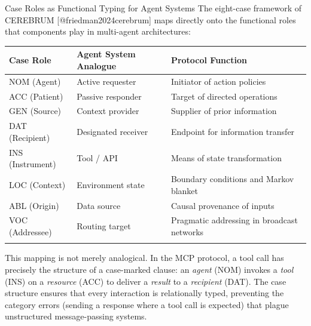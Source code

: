 \documentclass[
  ignorenonframetext,
]{beamer}
\newcounter{none} %
\begin{document}
\begin{frame}{Case Roles as Functional Typing for Agent Systems}
\protect{}\label{case-roles-as-functional-typing-for-agent-systems}
The eight-case framework of CEREBRUM {[}@friedman2024cerebrum{]} maps
directly onto the functional roles that components play in multi-agent
architectures:

{\def\LTcaptype{none} %
\begin{longtable}[]{@{}
  >{\raggedright\arraybackslash}p{}
  >{\raggedright\arraybackslash}p{}
  >{\raggedright\arraybackslash}p{}@{}}
\toprule\noalign{}
\begin{minipage}[b]{\linewidth}\raggedright
Case Role
\end{minipage} & \begin{minipage}[b]{\linewidth}\raggedright
Agent System Analogue
\end{minipage} & \begin{minipage}[b]{\linewidth}\raggedright
Protocol Function
\end{minipage} \\
\midrule\noalign{}
\endhead
NOM (Agent) & Active requester & Initiator of action policies \\
ACC (Patient) & Passive responder & Target of directed operations \\
GEN (Source) & Context provider & Supplier of prior information \\
DAT (Recipient) & Designated receiver & Endpoint for information
transfer \\
INS (Instrument) & Tool / API & Means of state transformation \\
LOC (Context) & Environment state & Boundary conditions and Markov
blanket \\
ABL (Origin) & Data source & Causal provenance of inputs \\
VOC (Addressee) & Routing target & Pragmatic addressing in broadcast
networks \\
\bottomrule\noalign{}
\end{longtable}
}

This mapping is not merely analogical. In the MCP protocol, a tool call
has precisely the structure of a case-marked clause: an \emph{agent}
(NOM) invokes a \emph{tool} (INS) on a \emph{resource} (ACC) to deliver
a \emph{result} to a \emph{recipient} (DAT). The case structure ensures
that every interaction is relationally typed, preventing the category
errors (sending a response where a tool call is expected) that plague
unstructured message-passing systems.
\end{frame}
\end{document}
